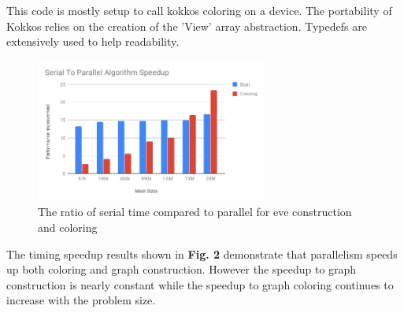 \documentclass[graybox]{svmult}
\begin{document}
This code is mostly setup to call kokkos coloring on a device.
The portability of Kokkos relies on the creation of the 'View' array
abstraction.
Typedefs are extensively used to help readability.

\begin{figure}[!ht]
	\centering
	\includegraphics[width=3in]{images/Parallel_Speedup.png}
	\caption{The ratio of serial time compared to parallel for eve construction and coloring }
	\label{fig:coloringSpeedup}
\end{figure}
The timing speedup results shown in \textbf{Fig. 2} demonstrate that parallelism speeds up both coloring and graph construction. However the speedup to graph construction is nearly constant while the speedup to graph coloring continues to increase with the problem size.
\end{document}

